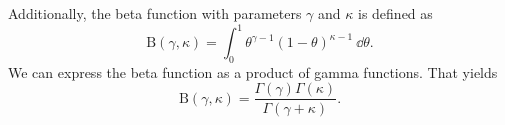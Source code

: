 Additionally, the beta function with parameters $\gamma$ and $\kappa$ is defined as
\begin{equation*}
    \mathrm{B}(\gamma,\kappa) = \int_0^1 \theta^{\gamma-1}(1-\theta)^{\kappa-1} \: \dd \theta.
\end{equation*}
We can express the beta function as a product of gamma functions. That yields
\begin{equation}
    \label{beta_as_gamma}
    \mathrm{B}(\gamma,\kappa) = \frac{\Gamma(\gamma)\Gamma(\kappa)}{\Gamma(\gamma+\kappa)}.
\end{equation}










